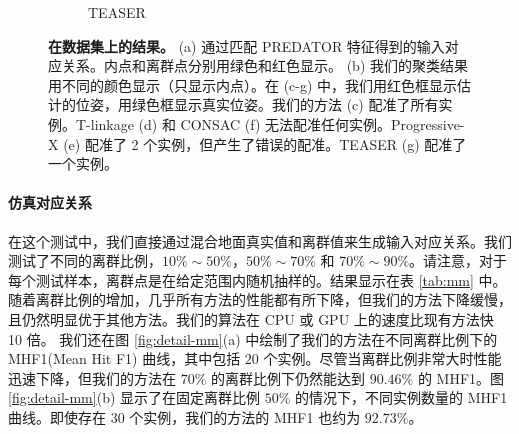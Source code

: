 \begin{figure}[ht]
\begin{subfigure}{0.18\textwidth}
          \caption{TEASER\cite{TEASER}}
          \label{fig:multi-teaser}
      \end{subfigure}
  
  \caption{\textbf{在数据集上的结果。} (a) 通过匹配 PREDATOR\cite{PREDATOR} 特征得到的输入对应关系。内点和离群点分别用绿色和红色显示。 (b) 我们的聚类结果用不同的颜色显示（只显示内点）。在 (c-g) 中，我们用红色框显示估计的位姿，用绿色框显示真实位姿。我们的方法 (c) 配准了所有实例。T-linkage (d) 和 CONSAC (f) 无法配准任何实例。Progressive-X (e) 配准了 2 个实例，但产生了错误的配准。TEASER (g) 配准了一个实例。}
  \label{fig:predatormm}
  \end{figure}
    
\paragraph{仿真对应关系}
在这个测试中，我们直接通过混合地面真实值和离群值来生成输入对应关系。我们测试了不同的离群比例，$10\%\sim50\%$，$50\%\sim70\%$ 和 $70\%\sim90\%$。请注意，对于每个测试样本，离群点是在给定范围内随机抽样的。结果显示在表 \ref{tab:mm} 中。随着离群比例的增加，几乎所有方法的性能都有所下降，但我们的方法下降缓慢，且仍然明显优于其他方法。我们的算法在 CPU 或 GPU 上的速度比现有方法快 10 倍。
我们还在图 \ref{fig:detail-mm}(a) 中绘制了我们的方法在不同离群比例下的 MHF1(Mean Hit F1) 曲线，其中包括 $20$ 个实例。尽管当离群比例非常大时性能迅速下降，但我们的方法在 $70\%$ 的离群比例下仍然能达到 $90.46\%$ 的 MHF1。图 \ref{fig:detail-mm}(b) 显示了在固定离群比例 $50\%$ 的情况下，不同实例数量的 MHF1 曲线。即使存在 $30$ 个实例，我们的方法的 MHF1 也约为 $92.73\%$。
  

